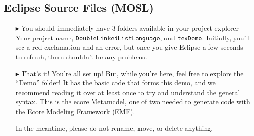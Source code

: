 \newpage
\texHeader
{}

\subsection{Eclipse Source Files (MOSL)}

\begin{itemize}
\FloatBarrier
\item[$\blacktriangleright$] You\hypertarget{simpleDemo tex}{} should immediately have 3 folders available in your project explorer - Your project name, \texttt{DoubleLinkedListLanguage}, and \texttt{texDemo}. Initially, you'll see a red exclamation and an error, but once you give Eclipse a few seconds to refresh, there shouldn't be any problems.

\item[$\blacktriangleright$] That's it! You're all set up! But, while you're here, feel free to explore the ``Demo'' folder! It has the basic code that forms this demo, and we recommend reading it over at least once to try and understand the general syntax. This is the ecore Metamodel, one of two needed to generate code with the Ecore Modeling Framework (EMF).

In the meantime, please do not rename, move, or delete anything.
\end{itemize}